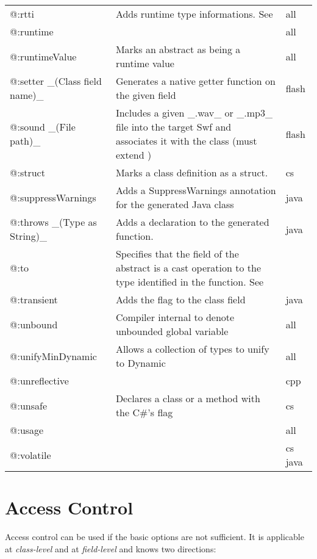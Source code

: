 \begin{center}
\begin{tabular}{| l | l | l |}
	@:rtti   &  Adds runtime type informations. See \tref{RTTI}{cr-rtti}  &  all \\
	@:runtime  &    &  all \\
	@:runtimeValue  &  Marks an abstract as being a runtime value  &  all \\
	@:setter \_(Class field name)\_  &  Generates a native getter function on the given field   &  flash \\
	@:sound \_(File path)\_  &  Includes a given \_.wav\_ or \_.mp3\_ file into the target Swf and associates it with the class (must extend \expr{flash.media.Sound})  &  flash \\
	@:struct  &  Marks a class definition as a struct.   &  cs \\
	@:suppressWarnings  &  Adds a SuppressWarnings annotation for the generated Java class  &  java \\
	@:throws \_(Type as String)\_  &  Adds a \expr{throws} declaration to the generated function.   &  java \\
	@:to  &  Specifies that the field of the abstract is a cast operation to the type identified in the function. See \tref{Implicit Casts}{types-abstract-implicit-casts} & ~ \\
	@:transient  &  Adds the \expr{transient} flag to the class field  &  java \\
	@:unbound  &  Compiler internal to denote unbounded global variable  &  all \\
	@:unifyMinDynamic  &  Allows a collection of types to unify to Dynamic  &  all \\
	@:unreflective  &    &  cpp \\
	@:unsafe  &  Declares a class  or a method with the C\#'s \expr{unsafe} flag   &  cs \\
	@:usage  &    &  all \\
	@:volatile  &    &  cs  java \\
\end{tabular}
\end{center}

\section{Access Control}
\label{lf-access-control}

Access control can be used if the basic  options are not sufficient. It is applicable at \emph{class-level} and at \emph{field-level} and knows two directions:

